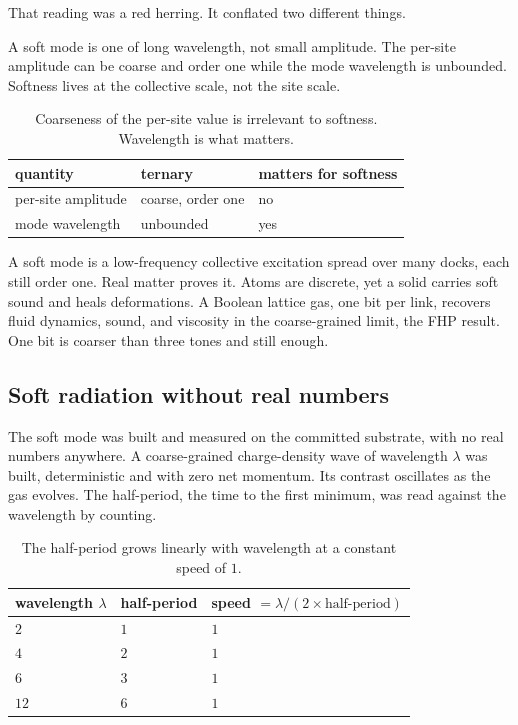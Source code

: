 That reading was a red herring. It conflated two different things.

\begin{principle}
A soft mode is one of long wavelength, not small amplitude. The per-site amplitude can be coarse and order one
while the mode wavelength is unbounded. Softness lives at the collective scale, not the site scale.
\end{principle}

\begin{table}[ht]
\centering
\begin{tabular}{@{}lll@{}}
\toprule
quantity & ternary & matters for softness \\
\midrule
per-site amplitude & coarse, order one & no \\
mode wavelength & unbounded & yes \\
\bottomrule
\end{tabular}
\caption{Coarseness of the per-site value is irrelevant to softness. Wavelength is what matters.}
\label{tab:softness}
\end{table}

A soft mode is a low-frequency collective excitation spread over many docks, each still order one. Real matter
proves it. Atoms are discrete, yet a solid carries soft sound and heals deformations. A Boolean lattice gas, one
bit per link, recovers fluid dynamics, sound, and viscosity in the coarse-grained limit, the FHP result. One bit
is coarser than three tones and still enough.

\subsection{Soft radiation without real numbers}

The soft mode was built and measured on the committed substrate, with no real numbers anywhere. A coarse-grained
charge-density wave of wavelength $\lambda$ was built, deterministic and with zero net momentum. Its contrast
oscillates as the gas evolves. The half-period, the time to the first minimum, was read against the wavelength by
counting.

\begin{table}[ht]
\centering
\begin{tabular}{@{}lll@{}}
\toprule
wavelength $\lambda$ & half-period & speed $= \lambda / (2 \times \text{half-period})$ \\
\midrule
$2$ & $1$ & $1$ \\
$4$ & $2$ & $1$ \\
$6$ & $3$ & $1$ \\
$12$ & $6$ & $1$ \\
\bottomrule
\end{tabular}
\caption{The half-period grows linearly with wavelength at a constant speed of $1$.}
\label{tab:soft-dispersion}
\end{table}

